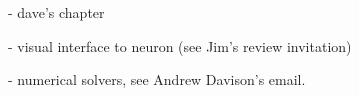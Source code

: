 \documentclass[12pt]{article}
\begin{document}
- dave's chapter

- visual interface to neuron (see Jim's review invitation)

- numerical solvers, see Andrew Davison's email.





\end{document}
